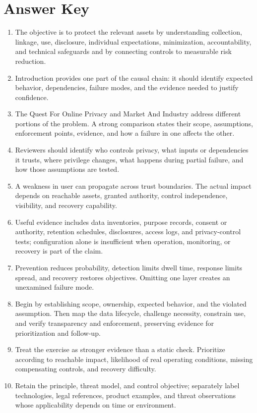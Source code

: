 \documentclass[11pt]{article}
\begin{document}
\section*{Answer Key}
\begin{enumerate}
\item The objective is to protect the relevant assets by understanding collection, linkage, use, disclosure, individual expectations, minimization, accountability, and technical safeguards and by connecting controls to measurable risk reduction.
\item Introduction provides one part of the causal chain: it should identify expected behavior, dependencies, failure modes, and the evidence needed to justify confidence.
\item The Quest For Online Privacy and Market And Industry address different portions of the problem. A strong comparison states their scope, assumptions, enforcement points, evidence, and how a failure in one affects the other.
\item Reviewers should identify who controls privacy, what inputs or dependencies it trusts, where privilege changes, what happens during partial failure, and how those assumptions are tested.
\item A weakness in user can propagate across trust boundaries. The actual impact depends on reachable assets, granted authority, control independence, visibility, and recovery capability.
\item Useful evidence includes data inventories, purpose records, consent or authority, retention schedules, disclosures, access logs, and privacy-control tests; configuration alone is insufficient when operation, monitoring, or recovery is part of the claim.
\item Prevention reduces probability, detection limits dwell time, response limits spread, and recovery restores objectives. Omitting one layer creates an unexamined failure mode.
\item Begin by establishing scope, ownership, expected behavior, and the violated assumption. Then map the data lifecycle, challenge necessity, constrain use, and verify transparency and enforcement, preserving evidence for prioritization and follow-up.
\item Treat the exercise as stronger evidence than a static check. Prioritize according to reachable impact, likelihood of real operating conditions, missing compensating controls, and recovery difficulty.
\item Retain the principle, threat model, and control objective; separately label technologies, legal references, product examples, and threat observations whose applicability depends on time or environment.
\end{enumerate}
\end{document}
